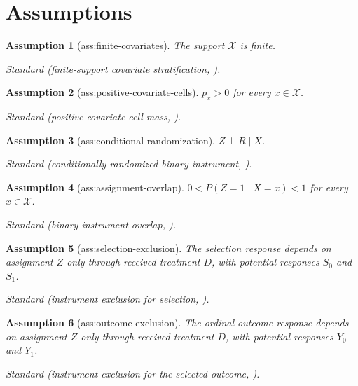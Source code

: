 \documentclass{article}
\newtheorem{assumption}{Assumption}
\begin{document}
\section{Assumptions}

\begin{assumption}[ass:finite-covariates]\label{ass:finite-covariates}
The support \(\mathcal X\) is finite.
\par\smallskip\noindent\emph{Standard} (finite-support covariate stratification, \cite{DongHeiler2026}).
\end{assumption}

\begin{assumption}[ass:positive-covariate-cells]\label{ass:positive-covariate-cells}
\(p_x>0\) for every \(x\in\mathcal X\).
\par\smallskip\noindent\emph{Standard} (positive covariate-cell mass, \cite{DongHeiler2026}).
\end{assumption}

\begin{assumption}[ass:conditional-randomization]\label{ass:conditional-randomization}
\(Z\perp R\mid X\).
\par\smallskip\noindent\emph{Standard} (conditionally randomized binary instrument, \cite{DongHeiler2026}).
\end{assumption}

\begin{assumption}[ass:assignment-overlap]\label{ass:assignment-overlap}
\(0<P(Z=1\mid X=x)<1\) for every \(x\in\mathcal X\).
\par\smallskip\noindent\emph{Standard} (binary-instrument overlap, \cite{DongHeiler2026}).
\end{assumption}

\begin{assumption}[ass:selection-exclusion]\label{ass:selection-exclusion}
The selection response depends on assignment \(Z\) only through received treatment \(D\), with potential responses \(S_0\) and \(S_1\).
\par\smallskip\noindent\emph{Standard} (instrument exclusion for selection, \cite{DongHeiler2026}).
\end{assumption}

\begin{assumption}[ass:outcome-exclusion]\label{ass:outcome-exclusion}
The ordinal outcome response depends on assignment \(Z\) only through received treatment \(D\), with potential responses \(Y_0\) and \(Y_1\).
\par\smallskip\noindent\emph{Standard} (instrument exclusion for the selected outcome, \cite{DongHeiler2026}).
\end{assumption}
\end{document}
